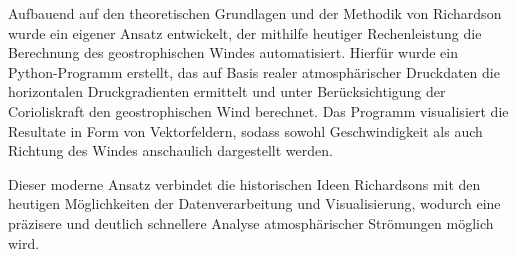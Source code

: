 Aufbauend auf den theoretischen Grundlagen und der Methodik von Richardson wurde ein eigener Ansatz entwickelt, der mithilfe heutiger Rechenleistung die Berechnung des geostrophischen Windes automatisiert.
Hierfür wurde ein Python-Programm erstellt, das auf Basis realer atmosphärischer Druckdaten die horizontalen Druckgradienten ermittelt und unter Berücksichtigung der Corioliskraft den geostrophischen Wind berechnet.
Das Programm visualisiert die Resultate in Form von Vektorfeldern, sodass sowohl Geschwindigkeit als auch Richtung des Windes anschaulich dargestellt werden.

Dieser moderne Ansatz verbindet die historischen Ideen Richardsons mit den heutigen Möglichkeiten der Datenverarbeitung und Visualisierung, wodurch eine präzisere und deutlich schnellere Analyse atmosphärischer Strömungen möglich wird.

